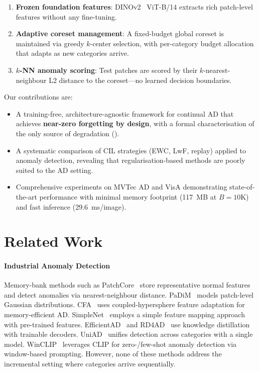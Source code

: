 \documentclass[conference]{IEEEtran}
\begin{document}
\begin{enumerate}
    \item \textbf{Frozen foundation features}: DINOv2~\cite{oquab2023dinov2} ViT-B/14 extracts rich patch-level features without any fine-tuning.
    \item \textbf{Adaptive coreset management}: A fixed-budget global coreset is maintained via greedy $k$-center selection, with per-category budget allocation that adapts as new categories arrive.
    \item \textbf{$k$-NN anomaly scoring}: Test patches are scored by their $k$-nearest-neighbour L2 distance to the coreset---no learned decision boundaries.
\end{enumerate}

Our contributions are:
\begin{itemize}
    \item A training-free, architecture-agnostic framework for continual AD that achieves \textbf{near-zero forgetting by design}, with a formal characterisation of the only source of degradation ().
    \item A systematic comparison of CIL strategies (EWC, LwF, replay) applied to anomaly detection, revealing that regularisation-based methods are poorly suited to the AD setting.
    \item Comprehensive experiments on MVTec AD and VisA demonstrating state-of-the-art performance with minimal memory footprint (117~MB at $B{=}10$K) and fast inference (29.6~ms/image).
\end{itemize}


\section{Related Work}

\paragraph{Industrial Anomaly Detection}
Memory-bank methods such as PatchCore~\cite{roth2022patchcore} store representative normal features and detect anomalies via nearest-neighbour distance. PaDiM~\cite{defard2021padim} models patch-level Gaussian distributions. CFA~\cite{lee2022cfa} uses coupled-hypersphere feature adaptation for memory-efficient AD. SimpleNet~\cite{liu2023simplenet} employs a simple feature mapping approach with pre-trained features. EfficientAD~\cite{batzner2024efficientad} and RD4AD~\cite{deng2022rd4ad} use knowledge distillation with trainable decoders. UniAD~\cite{you2022uniad} unifies detection across categories with a single model. WinCLIP~\cite{jeong2023winclip} leverages CLIP for zero-/few-shot anomaly detection via window-based prompting. However, none of these methods address the incremental setting where categories arrive sequentially.
\end{document}
